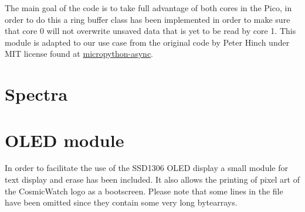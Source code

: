 The main goal of the code is to take full advantage of both cores in the Pico, in order to do this a ring buffer class has been implemented in order to make sure that core 0 will not overwrite unsaved data that is yet to be read by core 1. This module is adapted to our use case from the original code by Peter Hinch under MIT license found at \href{https://github.com/peterhinch/micropython-async/blob/master/v3/primitives/ringbuf_queue.py}{micropython-async}.



\section{Spectra}\label{sec:spectra.py}

\section{OLED module}

In order to facilitate the use of the SSD1306 OLED display a small module for text display and erase has been included. It also allows the printing of pixel art of the CosmicWatch logo as a bootscreen. Please note that some lines in the file have been omitted since they contain some very long bytearrays.

